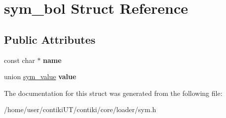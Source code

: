 \hypertarget{structsym__bol}{}\section{sym\+\_\+bol Struct Reference}
\label{structsym__bol}
\subsection*{Public Attributes}
\begin{DoxyCompactItemize}
\item 
\hypertarget{structsym__bol_aec19336ab02f1206fc397128af12422a}{}const char $\ast$ {\bfseries name}\label{structsym__bol_aec19336ab02f1206fc397128af12422a}

\item 
\hypertarget{structsym__bol_ae04e993ba0288eeb7b6531275f866c62}{}union \hyperlink{unionsym__value}{sym\+\_\+value} {\bfseries value}\label{structsym__bol_ae04e993ba0288eeb7b6531275f866c62}

\end{DoxyCompactItemize}


The documentation for this struct was generated from the following file\+:\begin{DoxyCompactItemize}
\item 
/home/user/contiki\+U\+T/contiki/core/loader/sym.\+h\end{DoxyCompactItemize}
